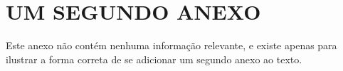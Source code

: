 \chapter{UM SEGUNDO ANEXO}
Este anexo não contém nenhuma informação relevante, e existe apenas para ilustrar a forma correta de se adicionar um segundo anexo ao texto.